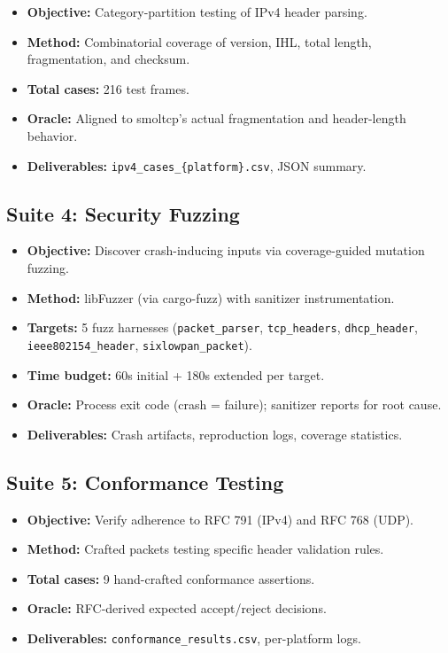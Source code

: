 \documentclass[11pt,a4paper]{article}
\begin{document}
\begin{itemize}[noitemsep]
\item \textbf{Objective:} Category-partition testing of IPv4 header parsing.
\item \textbf{Method:} Combinatorial coverage of version, IHL, total length, fragmentation, and checksum.
\item \textbf{Total cases:} 216 test frames.
\item \textbf{Oracle:} Aligned to smoltcp's actual fragmentation and header-length behavior.
\item \textbf{Deliverables:} \texttt{ipv4\_cases\_\{platform\}.csv}, JSON summary.
\end{itemize}

\subsection{Suite 4: Security Fuzzing}

\begin{itemize}[noitemsep]
\item \textbf{Objective:} Discover crash-inducing inputs via coverage-guided mutation fuzzing.
\item \textbf{Method:} libFuzzer (via cargo-fuzz) with sanitizer instrumentation.
\item \textbf{Targets:} 5 fuzz harnesses (\texttt{packet\_parser}, \texttt{tcp\_headers}, \texttt{dhcp\_header}, \texttt{ieee802154\_header}, \texttt{sixlowpan\_packet}).
\item \textbf{Time budget:} 60s initial + 180s extended per target.
\item \textbf{Oracle:} Process exit code (crash = failure); sanitizer reports for root cause.
\item \textbf{Deliverables:} Crash artifacts, reproduction logs, coverage statistics.
\end{itemize}

\subsection{Suite 5: Conformance Testing}

\begin{itemize}[noitemsep]
\item \textbf{Objective:} Verify adherence to RFC 791 (IPv4) and RFC 768 (UDP).
\item \textbf{Method:} Crafted packets testing specific header validation rules.
\item \textbf{Total cases:} 9 hand-crafted conformance assertions.
\item \textbf{Oracle:} RFC-derived expected accept/reject decisions.
\item \textbf{Deliverables:} \texttt{conformance\_results.csv}, per-platform logs.
\end{itemize}
\end{document}
